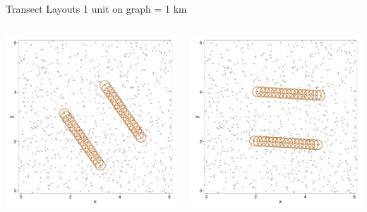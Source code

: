 \documentclass{beamer}
\begin{document}
\begin{frame}{Transect Layouts}
1 unit on graph = 1 km
	\begin{columns}
		\begin{column}{0.48\textwidth}
			\includegraphics[width=\textwidth]{../images/slides-layoutT2.pdf}
		\end{column}
		\begin{column}{0.48\textwidth}
			\includegraphics[width=\textwidth]{../images/slides-layoutT1.pdf}
		\end{column}
	\end{columns}


\end{frame}
\end{document}

